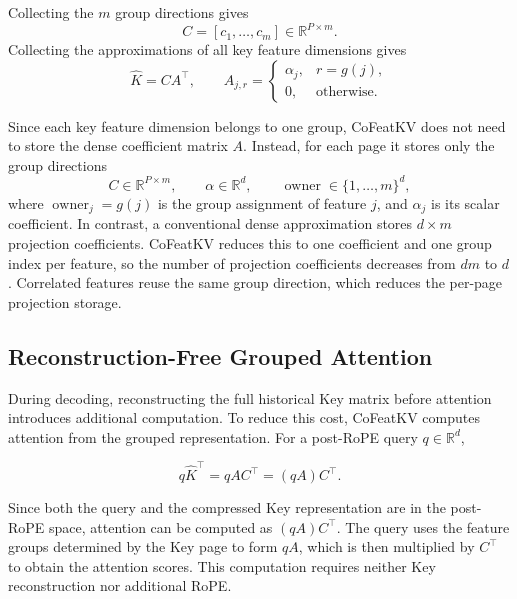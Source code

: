 \documentclass{article} %
\begin{document}
Collecting the $m$ group directions gives
\begin{equation}
    C=[c_1,\ldots,c_m]\in\mathbb{R}^{P\times m}.
\end{equation}
Collecting the approximations of all key feature dimensions gives
\begin{equation}
    \widehat K=CA^\top,
    \qquad
    A_{j,r}=
    \begin{cases}
        \alpha_j, & r=g(j),\\
        0, & \text{otherwise}.
    \end{cases}
    \label{eq:sparse-projection}
\end{equation}

Since each key feature dimension belongs to one group, CoFeatKV does
not need to store the dense coefficient matrix $A$. Instead, for each page it
stores only the group directions
\begin{equation}
    C\in\mathbb{R}^{P\times m},\qquad
    \alpha\in\mathbb{R}^{d},\qquad
    \operatorname{owner}\in\{1,\ldots,m\}^{d},
\end{equation}
where $\operatorname{owner}_j=g(j)$ is the group assignment of feature
$j$, and $\alpha_j$ is its scalar coefficient. In contrast, a conventional
dense approximation stores $d\times m$ projection coefficients. CoFeatKV
reduces this to one coefficient and one group index per feature, so the number
of projection coefficients decreases from $dm$ to $d$. Correlated features
reuse the same group direction, which reduces the per-page projection storage.


\subsection{Reconstruction-Free Grouped Attention}

During decoding, reconstructing the full historical Key matrix before
attention introduces additional computation. To reduce this cost, CoFeatKV
computes attention from the grouped representation. For a post-RoPE query
$q\in\mathbb{R}^{d}$,

\begin{equation}
    q\widehat K^\top
    =
    qAC^\top
    =
    (qA)C^\top.
    \label{eq:direct-attn}
\end{equation}

Since both the query and the compressed Key representation are in the
post-RoPE space, attention can be computed as $(qA)C^\top$. The query uses
the feature groups determined by the Key page to form $qA$, which is then
multiplied by $C^\top$ to obtain the attention scores. This computation
requires neither Key reconstruction nor additional RoPE.
\end{document}
